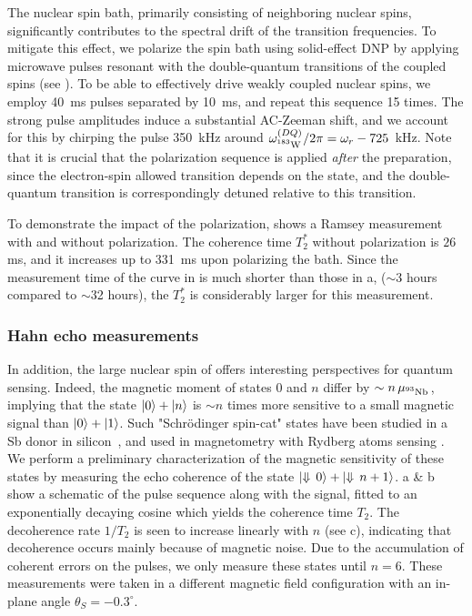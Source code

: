 The nuclear spin bath, primarily consisting of neighboring \W nuclear spins, significantly contributes to the spectral drift of the \Nb transition frequencies. To mitigate this effect, we polarize the spin bath using solid-effect DNP by applying microwave pulses resonant with the double-quantum transitions of the coupled \W spins (see ). To be able to effectively drive weakly coupled \W nuclear spins, we employ 40~ms pulses separated by 10~ms, and repeat this sequence 15 times. The strong pulse amplitudes induce a substantial AC-Zeeman shift, and we account for this by chirping the pulse 350~kHz around $\omega_{\text{$^{183}$W\,}}^{\text(DQ)}/2\pi = \omega_r - 725$~kHz. Note that it is crucial that the \W polarization sequence is applied \emph{after} the \Nb preparation, since the electron-spin allowed transition depends on the \Nb state, and the \W double-quantum transition is correspondingly detuned relative to this transition.

To demonstrate the impact of the \W polarization,  shows a \Nb Ramsey measurement with and without \W polarization. The \Nb coherence time $T_2^*$ without \W polarization is $26$\,ms, and it increases up to 331~ms upon polarizing the \W bath. Since the measurement time of the curve in  is much shorter than those in a, ($\sim$3 hours compared to $\sim$32 hours), the $T_2^*$ is considerably larger for this measurement.

\subsubsection{Hahn echo measurements}

In addition, the large nuclear spin of \Nb offers interesting perspectives for quantum sensing. Indeed, the magnetic moment of states $0$ and $n$ differ by $\sim n \, \mu_\text{$^{93}$Nb\,}$, implying that the state $\ket{0} + \ket{n}$ is $\sim n$ times more sensitive to a small magnetic signal than $\ket{0} + \ket{1}$. Such "Schrödinger spin-cat" states have been studied in a Sb donor in silicon~, and used in magnetometry with Rydberg atoms sensing . We perform a preliminary characterization of the magnetic sensitivity of these states by measuring the echo coherence of the state $\ket{\Downarrow \, 0} + \ket{\Downarrow \, n+1}$. a \& b show a schematic of the pulse sequence along with the signal, fitted to an exponentially decaying cosine which yields the coherence time $T_{2}$. The decoherence rate $1/T_2$ is seen to increase linearly with $n$ (see c), indicating that decoherence occurs mainly because of magnetic noise. Due to the accumulation of coherent errors on the pulses, we only measure these states until $n=6$. These measurements were taken in a different magnetic field configuration with an in-plane angle $\theta_S=-0.3^\circ$. 

